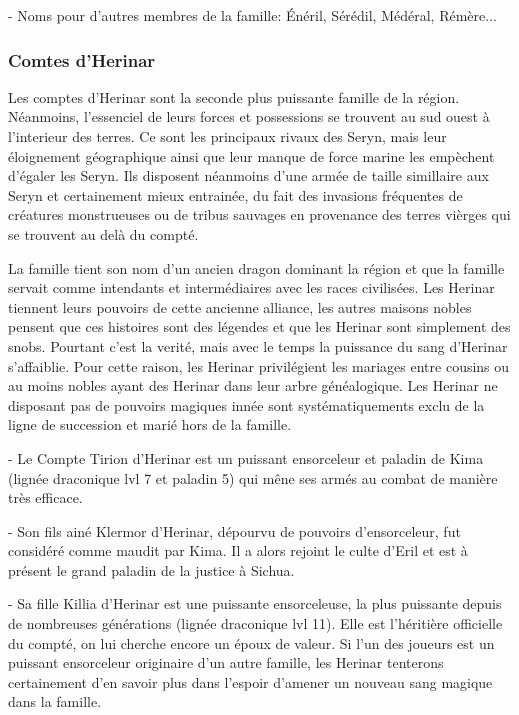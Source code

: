 - Noms pour d'autres membres de la famille: Énéril, Sérédil, Médéral, Rémère...

\subsubsection*{Comtes d'Herinar}

Les comptes d'Herinar sont la seconde plus puissante famille de la région. Néanmoins,
l'essenciel de leurs forces et possessions se trouvent au sud ouest à l'interieur
des terres. Ce sont les principaux rivaux des Seryn, mais leur éloignement
géographique ainsi que leur manque de force marine les empèchent d'égaler les Seryn.
Ils disposent néanmoins d'une armée de taille simillaire aux Seryn et certainement 
mieux entrainée, du fait des invasions fréquentes de créatures monstrueuses ou de
tribus sauvages en provenance des terres vièrges qui se trouvent au delà du compté. 

La famille tient son nom d'un ancien dragon dominant la région et que la famille 
servait comme intendants et intermédiaires avec les races civilisées. Les Herinar 
tiennent leurs pouvoirs de cette
ancienne alliance, les autres maisons nobles pensent que ces histoires sont des 
légendes et que les Herinar sont simplement des snobs. Pourtant c'est la verité,
mais avec le temps la puissance du sang d'Herinar s'affaiblie.
Pour cette raison, les Herinar privilégient les mariages entre cousins ou au moins
nobles ayant des Herinar dans leur arbre généalogique. Les Herinar ne disposant pas 
de pouvoirs magiques innée sont systématiquements exclu de la ligne de succession et
marié hors de la famille.

- Le Compte Tirion d'Herinar est un puissant ensorceleur et paladin de Kima
  (lignée draconique lvl 7 et paladin 5) qui mêne ses armés au combat de manière
  très efficace.

- Son fils ainé Klermor d'Herinar, dépourvu de pouvoirs d'ensorceleur, fut 
  considéré comme maudit par Kima. Il a alors rejoint le culte d'Eril et est à 
  présent le grand paladin de la justice à Sichua.

- Sa fille Killia d'Herinar est une puissante ensorceleuse, la plus puissante 
  depuis de nombreuses générations (lignée draconique lvl 11). Elle est 
  l'héritière officielle du compté, on lui cherche encore un époux de valeur.
  Si l'un des joueurs est un puissant ensorceleur originaire d'un autre famille,
  les Herinar tenterons certainement d'en savoir plus dans l'espoir d'amener un 
  nouveau sang magique dans la famille.

